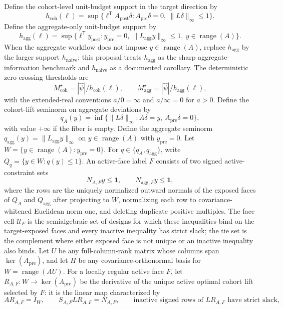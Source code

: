 \documentclass[11pt]{article}
\newcommand{\one}{\mathbf{1}}
\newcommand{\transpose}{\mathsf{T}}
\theoremstyle{definition}
\theoremstyle{plain}
\theoremstyle{remark}
\begin{document}
Define the cohort-level unit-budget support in the target direction by
\[
  h_{\mathrm{coh}}(\ell)
  =
  \sup\{\ell^\transpose A_{\mathrm{post}}\delta:
       A_{\mathrm{pre}}\delta=0,\ \|L\delta\|_\infty\le1\}.
\]
Define the aggregate-only unit-budget support by
\[
  h_{\mathrm{agg}}(\ell)
  =
  \sup\{\ell^\transpose y_{\mathrm{post}}:
       y_{\mathrm{pre}}=0,\ \|L_{\mathrm{agg}}y\|_\infty\le1,\ y\in\operatorname{range}(A)\}.
\]
When the aggregate workflow does not impose \(y\in\operatorname{range}(A)\), replace \(h_{\mathrm{agg}}\) by the larger support \(h_{\mathrm{naive}}\); this proposal treats \(h_{\mathrm{agg}}\) as the sharp aggregate-information benchmark and \(h_{\mathrm{naive}}\) as a documented corollary.
The deterministic zero-crossing thresholds are
\[
  M_{\mathrm{coh}}^\star = |\hat\psi|/h_{\mathrm{coh}}(\ell),
  \qquad
  M_{\mathrm{agg}}^\star = |\hat\psi|/h_{\mathrm{agg}}(\ell),
\]
with the extended-real conventions \(a/0=\infty\) and \(a/\infty=0\) for \(a>0\).
Define the cohort-lift seminorm on aggregate deviations by
\[
  q_A(y)
  =
  \inf\{\|L\delta\|_\infty:
       A\delta=y,\ A_{\mathrm{pre}}\delta=0\},
\]
with value \(+\infty\) if the fiber is empty.
Define the aggregate seminorm \(q_{\mathrm{agg}}(y)=\|L_{\mathrm{agg}}y\|_\infty\) on \(y\in\operatorname{range}(A)\) with \(y_{\mathrm{pre}}=0\).
Let \(W=\{y\in\operatorname{range}(A):y_{\mathrm{pre}}=0\}\).
For \(q\in\{q_A,q_{\mathrm{agg}}\}\), write \(Q_q=\{y\in W:q(y)\le1\}\).
An active-face label \(F\) consists of two signed active-constraint sets
\[
  N_{A,F}y\le \one,\qquad N_{\mathrm{agg},F}y\le\one,
\]
where the rows are the uniquely normalized outward normals of the exposed faces of \(Q_A\) and \(Q_{\mathrm{agg}}\) after projecting to \(W\), normalizing each row to covariance-whitened Euclidean norm one, and deleting duplicate positive multiples.
The face cell \(\mathcal U_F\) is the semialgebraic set of designs for which these inequalities bind on the target-exposed faces and every inactive inequality has strict slack; the tie set is the complement where either exposed face is not unique or an inactive inequality also binds.
Let \(U\) be any full-column-rank matrix whose columns span \(\ker(A_{\mathrm{pre}})\), and let \(H\) be any covariance-orthonormal basis for \(W=\operatorname{range}(AU)\).
For a locally regular active face \(F\), let \(R_{A,F}:W\to\ker(A_{\mathrm{pre}})\) be the derivative of the unique active optimal cohort lift selected by \(F\): it is the linear map characterized by
\[
  A R_{A,F}=I_W,\qquad
  S_{A,F} L R_{A,F}=N_{A,F},\qquad
  \text{inactive signed rows of } LR_{A,F}\text{ have strict slack},
\]
\end{document}
